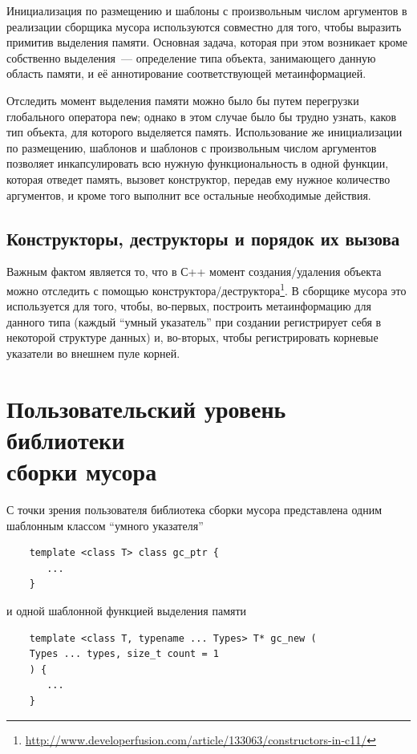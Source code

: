 Инициализация по размещению и шаблоны с произвольным числом аргументов в реализации сборщика мусора используются 
совместно для того, чтобы выразить примитив выделения памяти. Основная задача, которая при этом возникает 
кроме собственно выделения~--- определение типа объекта, занимающего данную область памяти, и её аннотирование
соответствующей метаинформацией. 

Отследить момент выделения памяти можно было бы путем перегрузки глобального оператора \lstinline{new}; однако
в этом случае было бы трудно узнать, каков тип объекта, для которого выделяется память. Использование же
инициализации по размещению, шаблонов и шаблонов с произвольным числом аргументов позволяет инкапсулировать
всю нужную функциональность в одной функции, которая отведет память, вызовет конструктор, передав
ему нужное количество аргументов, и кроме того выполнит все остальные необходимые действия.

 \subsection{Конструкторы, деструкторы и порядок их вызова} 

Важным фактом является то, что в С++ момент создания/удаления объекта можно отследить с помощью 
конструктора/деструктора\footnote{\url{http://www.developerfusion.com/article/133063/constructors-in-c11/}}. 
В сборщике мусора это используется для того, чтобы, во-первых, построить метаинформацию для данного типа (каждый
``умный указатель'' при создании регистрирует себя в некоторой структуре данных) и, во-вторых, чтобы регистрировать
корневые указатели во внешнем пуле корней.

\section {Пользовательский уровень библиотеки\\
сборки мусора}

С точки зрения пользователя библиотека сборки мусора представлена одним шаблонным классом
``умного указателя'' 

\begin{lstlisting}
    template <class T> class gc_ptr {
       ...
    }
\end{lstlisting}

и одной шаблонной функцией выделения памяти

\begin{lstlisting}
    template <class T, typename ... Types> T* gc_new (
    Types ... types, size_t count = 1
    ) {
       ...
    }
\end{lstlisting}

